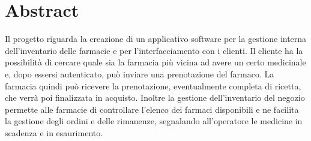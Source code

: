 \newpage
{}
\section{Abstract}
Il progetto riguarda la creazione di un applicativo software per la gestione interna dell’inventario delle farmacie e per l'interfacciamento con i clienti. 
Il cliente ha la possibilità di cercare quale sia la farmacia più vicina ad avere un certo medicinale e, dopo essersi autenticato, può inviare una prenotazione del farmaco.
La farmacia quindi può ricevere la prenotazione, eventualmente completa di ricetta, che verrà poi finalizzata in acquisto. 
Inoltre la gestione dell’inventario del negozio permette alle farmacie di controllare l’elenco dei farmaci disponibili e ne facilita la gestione degli ordini e delle rimanenze, segnalando all'operatore le medicine in scadenza e in esaurimento.
